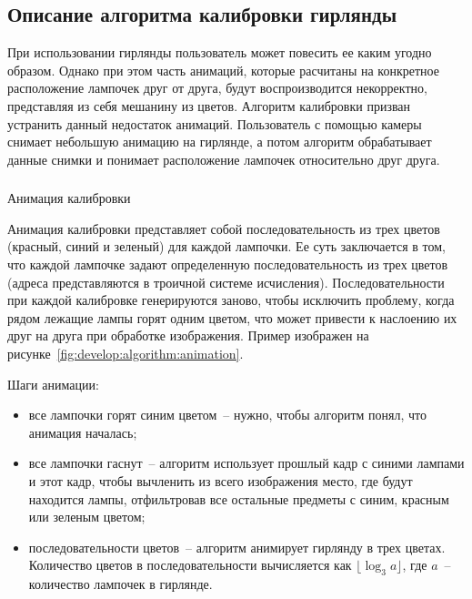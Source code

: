 \subsection{Описание алгоритма калибровки гирлянды}
\label{sec:develop:algorithm}

При использовании гирлянды пользователь может повесить ее каким угодно образом. Однако при этом часть анимаций, которые расчитаны на конкретное расположение лампочек друг от друга, будут воспроизводится некорректно, представляя из себя мешанину из цветов. Алгоритм калибровки призван устранить данный недостаток анимаций. Пользователь с помощью камеры снимает небольшую анимацию на гирлянде, а потом алгоритм обрабатывает данные снимки и понимает расположение лампочек относительно друг друга.

\subsubsection{} Анимация калибровки
\label{sec:develop:algorithm:animation}

Анимация калибровки представляет собой последовательность из трех цветов (красный, синий и зеленый) для каждой лампочки. Ее суть заключается в том, что каждой лампочке задают определенную последовательность из трех цветов (адреса представляются в троичной системе исчисления). Последовательности при каждой калибровке генерируются заново, чтобы исключить проблему, когда рядом лежащие лампы горят одним цветом, что может привести к наслоению их друг на друга при обработке изображения. Пример изображен на рисунке~\ref{fig:develop:algorithm:animation}.

Шаги анимации:
\begin{itemize}
	\item все лампочки горят синим цветом~-- нужно, чтобы алгоритм понял, что анимация началась;
	\item все лампочки гаснут~-- алгоритм использует прошлый кадр с синими лампами и этот кадр, чтобы вычленить из всего изображения место, где будут находится лампы, отфильтровав все остальные предметы с синим, красным или зеленым цветом;
	\item последовательности цветов~-- алгоритм анимирует гирлянду в трех цветах. Количество цветов в последовательности вычисляется как $\lfloor\log_3 a\rfloor$, где $a$~-- количество лампочек в гирлянде.
\end{itemize}

